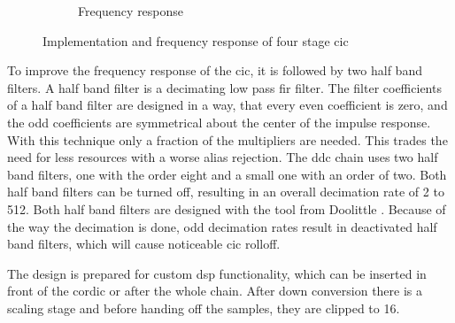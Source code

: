 \documentclass[12pt,a4paper,parskip=full,abstracton]{scrartcl}
\begin{document}
\begin{figure}[htb]
\begin{subfigure}[c]{.5\linewidth}
        \caption{Frequency response}
        \label{fig:cicresponse}
    \end{subfigure}
    \caption{Implementation and frequency response of four stage \gls{cic}}
\end{figure}

To improve the frequency response of the \gls{cic}, it is followed by two half band
filters. A half band filter is a decimating low pass \gls{fir} filter. The filter coefficients
of a half band filter are designed in a way, that every even coefficient is zero, and the odd coefficients
are symmetrical about the center of the impulse response. With this technique
only a fraction of the multipliers are needed. This trades the need for less resources with
a worse alias rejection. The \gls{ddc} chain uses two half band filters,
one with the order eight and a small one with an order of two. Both half band filters can be
turned off, resulting in an overall decimation rate of 2 to 512. Both half band
filters are designed with the tool from Doolittle \cite{halfband}. Because of
the way the decimation is done, odd decimation rates result in deactivated half band
filters, which will cause noticeable \gls{cic} rolloff.

The design is prepared for custom \gls{dsp} functionality, which can be inserted in front
of the cordic or after the whole chain. After down conversion there is a scaling stage and
before handing off the samples, they are clipped to \SI{16}{\bit}.
\end{document}
